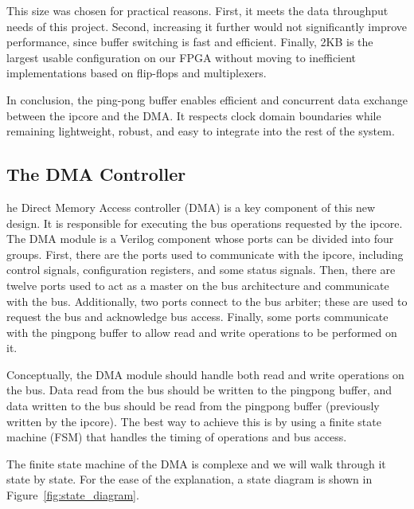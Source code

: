 \documentclass[a4paper,11pt,oneside]{report}
\begin{document}
This size was chosen for practical reasons. 
First, it meets the data throughput needs of this project. 
Second, increasing it further would not significantly improve performance, since buffer switching is fast and efficient. 
Finally, 2KB is the largest usable configuration on our FPGA without moving to inefficient implementations based on flip-flops and multiplexers.

In conclusion, the ping-pong buffer enables efficient and concurrent data exchange between the ipcore and the DMA. 
It respects clock domain boundaries while remaining lightweight, robust, and easy to integrate into the rest of the system.

\subsection{The DMA Controller}

he Direct Memory Access controller (DMA) is a key component of this new design.  
It is responsible for executing the bus operations requested by the ipcore.  
The DMA module is a Verilog component whose ports can be divided into four groups.  
First, there are the ports used to communicate with the ipcore, including control signals, configuration registers, and some status signals.  
Then, there are twelve ports used to act as a master on the bus architecture and communicate with the bus.  
Additionally, two ports connect to the bus arbiter; these are used to request the bus and acknowledge bus access.  
Finally, some ports communicate with the pingpong buffer to allow read and write operations to be performed on it.

Conceptually, the DMA module should handle both read and write operations on the bus.  
Data read from the bus should be written to the pingpong buffer,  
and data written to the bus should be read from the pingpong buffer (previously written by the ipcore).  
The best way to achieve this is by using a finite state machine (FSM) that handles the timing of operations and bus access.

The finite state machine of the DMA is complexe and we will walk through it state by state.
For the ease of the explanation, a state diagram is shown in Figure~\ref{fig:state_diagram}.
\end{document}
